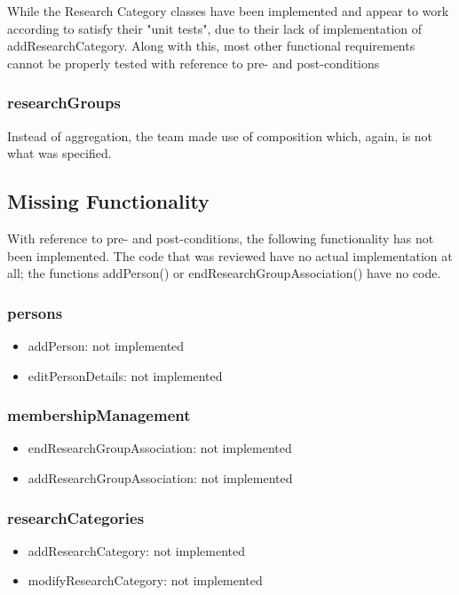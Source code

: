 \documentclass{article}
\begin{document}
		While the Research Category classes have been implemented and appear to work according to satisfy their "unit tests", due to their lack of implementation of addResearchCategory. Along with this, most other functional requirements cannot be properly tested with reference to pre- and post-conditions

		\subsubsection{researchGroups}

		Instead of aggregation, the team made use of composition which, again, is not what was specified.


    \subsection{Missing Functionality}

    With reference to pre- and post-conditions, the following functionality has not been implemented. The code that was reviewed have no actual implementation at all; the functions addPerson() or endResearchGroupAssociation() have no code.
	
		\subsubsection{persons} 
			\begin{itemize}
			\item addPerson: not implemented
			\item editPersonDetails: not implemented
			\end{itemize}

		\subsubsection{membershipManagement}
			\begin{itemize}
			\item endResearchGroupAssociation: not implemented
			\item addResearchGroupAssociation: not implemented
			\end{itemize}

		\subsubsection{researchCategories}
			\begin{itemize}
			\item addResearchCategory: not implemented
			\item modifyResearchCategory: not implemented
			\end{itemize}
\end{document}
